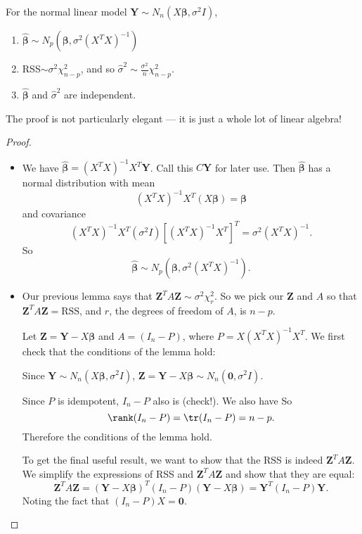 \documentclass[a4paper]{article}
\begin{document}
\begin{thm}
  For the normal linear model $\mathbf{Y}\sim N_n(X\boldsymbol\beta, \sigma^2 I)$,
  \begin{enumerate}
    \item $\hat{\boldsymbol\beta} \sim N_p(\boldsymbol\beta, \sigma^2(X^TX)^{-1})$
    \item RSS$\sim \sigma^2 \chi_{n - p}^2$, and so $\hat{\sigma}^2 \sim \frac{\sigma^2}{n}\chi_{n -p}^2$.
    \item $\hat{\boldsymbol\beta}$ and $\hat{\sigma}^2$ are independent.
  \end{enumerate}
\end{thm}

The proof is not particularly elegant --- it is just a whole lot of linear algebra!

\begin{proof}\leavevmode
  \begin{itemize}
    \item We have $\hat{\boldsymbol\beta} = (X^TX)^{-1}X^T\mathbf{Y}$. Call this $C\mathbf{Y}$ for later use. Then $\hat {\boldsymbol\beta}$ has a normal distribution with mean
      \[
        (X^TX)^{-1}X^T(X\boldsymbol\beta) = \boldsymbol\beta
      \]
      and covariance
      \[
        (X^TX)^{-1}X^T(\sigma^2 I)[(X^TX)^{-1}X^T]^T = \sigma^2(X^TX)^{-1}.
      \]
      So
      \[
        \hat{\boldsymbol\beta}\sim N_p(\boldsymbol\beta, \sigma^2(X^TX)^{-1}).
      \]
    \item
      Our previous lemma says that $\mathbf{Z}^TA\mathbf{Z}\sim \sigma^2 \chi_r^2$. So we pick our $\mathbf{Z}$ and $A$ so that $\mathbf{Z}^TA\mathbf{Z} = \mathrm{RSS}$, and $r$, the degrees of freedom of $A$, is $n - p$.

      Let $\mathbf{Z} = \mathbf{Y} - X\boldsymbol\beta$ and $A = (I_n - P)$, where $P = X(X^TX)^{-1}X^T$. We first check that the conditions of the lemma hold:

      Since $\mathbf{Y}\sim N_n(X\boldsymbol\beta, \sigma^2 I)$, $\mathbf{Z} = \mathbf{Y} - X\boldsymbol\beta\sim N_n(\mathbf{0}, \sigma^2 I)$.

      Since $P$ is idempotent, $I_n - P$ also is (check!). We also have
      So
      \[
        \rank(I_n - P) = \tr(I_n - P) = n - p.
      \]
      Therefore the conditions of the lemma hold.

      To get the final useful result, we want to show that the RSS is indeed $\mathbf{Z}^TA\mathbf{Z}$. We simplify the expressions of RSS and $\mathbf{Z}^TA\mathbf{Z}$ and show that they are equal:
      \[
        \mathbf{Z}^TA\mathbf{Z} = (\mathbf{Y} - X\boldsymbol\beta)^T(I_n - P)(\mathbf{Y} - X\boldsymbol\beta)=\mathbf{Y}^T(I_n - P)\mathbf{Y}.
      \]
      Noting the fact that $(I_n - P)X = \mathbf{0}$.


\end{itemize}
\end{proof}
\end{document}
